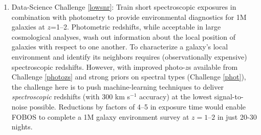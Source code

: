 \documentclass[oneside,11pt]{amsart}
\newcounter{chalno}
\newcommand{\chal}[1]{\refstepcounter{chalno}\label{#1}}
\begin{document}



\begin{enumerate}[rightmargin=0.2cm,leftmargin=0.2cm]
%
\chal{lowsnr}
%
\item[] {\textsf {\large Data-Science Challenge \ref{lowsnr}: Train
short spectroscopic exposures in combination with photometry to provide
environmental diagnostics for 1M galaxies at $z$=1--2}}.  Photometric
redshifts, while acceptable in large cosmological analyses, wash out
information about the local position of galaxies with respect to one
another.  To characterize a galaxy's local environment and identify its
neighbors requires (observationally expensive) spectroscopic redshifts.  However, with improved photo-$z$s available
from Challenge \ref{photozs} and strong priors on spectral types
(Challenge \ref{phot}), the challenge here is to push machine-learning techniques to deliver
\emph{spectroscopic} redshifts (with 300 km s$^{-1}$ accuracy) at the lowest signal-to-noise possible.  Reductions by
factors of 4--5 in exposure time would enable FOBOS to complete a 1M galaxy environment survey at $z=1$--$2$ in just
20-30 nights.

\end{enumerate}
\end{document}

